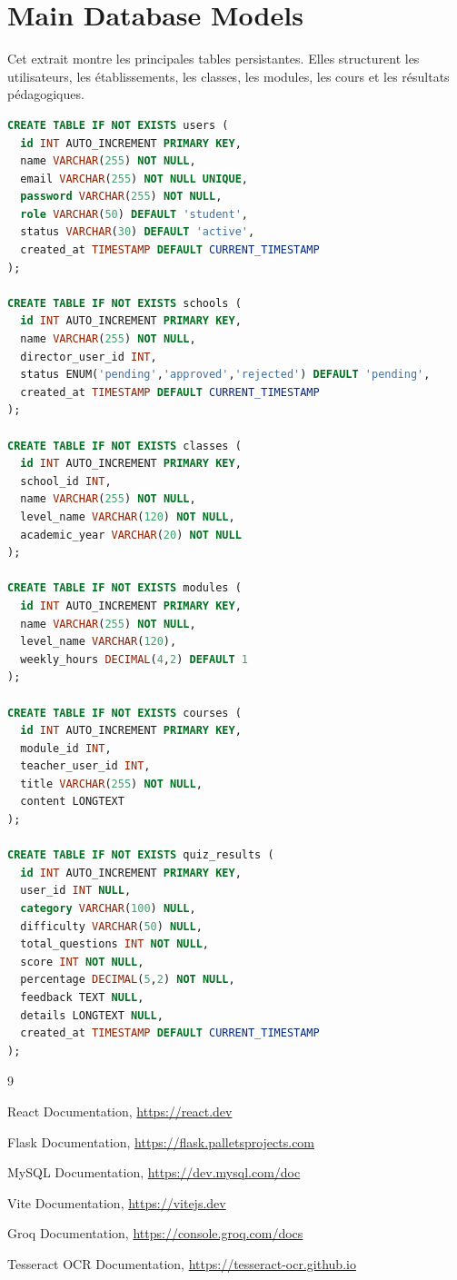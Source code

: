 \documentclass[12pt,a4paper]{report}
\begin{document}
\section{Main Database Models}
Cet extrait montre les principales tables persistantes. Elles structurent les
utilisateurs, les établissements, les classes, les modules, les cours et les
résultats pédagogiques.

\begin{lstlisting}[style=learnixcode,language=SQL,caption={Tables principales de la base Learnix AI},label={lst:main-database-models}]
CREATE TABLE IF NOT EXISTS users (
  id INT AUTO_INCREMENT PRIMARY KEY,
  name VARCHAR(255) NOT NULL,
  email VARCHAR(255) NOT NULL UNIQUE,
  password VARCHAR(255) NOT NULL,
  role VARCHAR(50) DEFAULT 'student',
  status VARCHAR(30) DEFAULT 'active',
  created_at TIMESTAMP DEFAULT CURRENT_TIMESTAMP
);

CREATE TABLE IF NOT EXISTS schools (
  id INT AUTO_INCREMENT PRIMARY KEY,
  name VARCHAR(255) NOT NULL,
  director_user_id INT,
  status ENUM('pending','approved','rejected') DEFAULT 'pending',
  created_at TIMESTAMP DEFAULT CURRENT_TIMESTAMP
);

CREATE TABLE IF NOT EXISTS classes (
  id INT AUTO_INCREMENT PRIMARY KEY,
  school_id INT,
  name VARCHAR(255) NOT NULL,
  level_name VARCHAR(120) NOT NULL,
  academic_year VARCHAR(20) NOT NULL
);

CREATE TABLE IF NOT EXISTS modules (
  id INT AUTO_INCREMENT PRIMARY KEY,
  name VARCHAR(255) NOT NULL,
  level_name VARCHAR(120),
  weekly_hours DECIMAL(4,2) DEFAULT 1
);

CREATE TABLE IF NOT EXISTS courses (
  id INT AUTO_INCREMENT PRIMARY KEY,
  module_id INT,
  teacher_user_id INT,
  title VARCHAR(255) NOT NULL,
  content LONGTEXT
);

CREATE TABLE IF NOT EXISTS quiz_results (
  id INT AUTO_INCREMENT PRIMARY KEY,
  user_id INT NULL,
  category VARCHAR(100) NULL,
  difficulty VARCHAR(50) NULL,
  total_questions INT NOT NULL,
  score INT NOT NULL,
  percentage DECIMAL(5,2) NOT NULL,
  feedback TEXT NULL,
  details LONGTEXT NULL,
  created_at TIMESTAMP DEFAULT CURRENT_TIMESTAMP
);
\end{lstlisting}


\clearpage
{}

\begin{thebibliography}{9}

React Documentation, \url{https://react.dev}

Flask Documentation, \url{https://flask.palletsprojects.com}

MySQL Documentation, \url{https://dev.mysql.com/doc}

Vite Documentation, \url{https://vitejs.dev}

Groq Documentation, \url{https://console.groq.com/docs}

Tesseract OCR Documentation, \url{https://tesseract-ocr.github.io}

\end{thebibliography}
\end{document}

